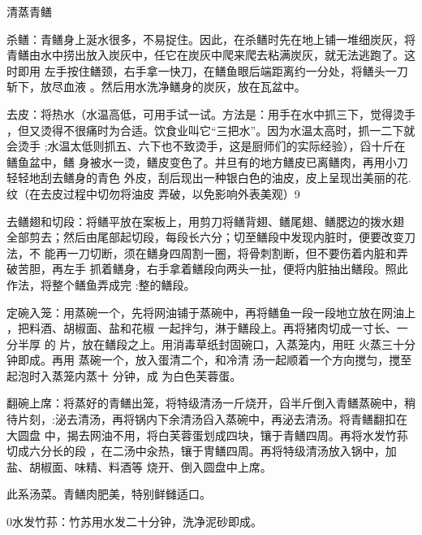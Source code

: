 \begin{recipe}{清蒸青鳝}

\ingredients



\cooking

\step 杀鳝：青鳝身上涎水很多，不易捉住。因此，在杀鳝时先在地上铺一堆细炭灰，将
青鳝由水中捞出放入炭灰中，任它在炭灰中爬来爬去粘满炭灰，就无法逃跑了。这时即用
左手按住鳝颈，右手拿一快刀，在鳝鱼眼后端距离约一分处，将鳝头一刀斩下，放尽血液
。然后用水洗净鳝身的炭灰，放在瓦盆中。

\step 去皮：将热水（水温高低，可用手试一试。方法是：用手在水中抓三下，觉得烫手
，但又烫得不很痛时为合适。饮食业叫它“三把水”。因为水温太高时，抓一二下就会烫手
;水温太低则抓五、六下也不致烫手，这是厨师们的实际经验），舀十斤在鳝鱼盆中，鳝
身被水一烫，鳝皮变色了。并旦有的地方鳝皮已离鳝肉，再用小刀轻轻地刮去鳝身的青色
外皮，刮后现出一种银白色的油皮，皮上呈现岀美丽的花.纹（在去皮过程中切勿将油皮
弄破，以免影响外表美观）9

\step 去鳝翅和切段：将鳝平放在案板上，用剪刀将鳝背翅、鳝尾翅、鳝腮边的拨水翅
全部剪去；然后由尾部起切段，每段长六分；切至鳝段中发现内脏时，便要改变刀法，不
能再一刀切断，须在鳝身四周割一圈，将骨刺割断，但不要伤着内脏和弄破苦胆，再左手
抓着鳝身，右手拿着鳝段向两头一扯，便将内脏抽出鳝段。照此作法，将整个鳝鱼弄成完
:整的鳝段。

\step 定碗入笼：用蒸碗一个，先将网油铺于蒸碗中，再将鳝鱼一段一段地立放在网油上
，把料酒、胡椒面、盐和花椒 一起拌匀，淋于鳝段上。再将猪肉切成一寸长、一分半厚
的 片，放在鳝段之上。用消毒草纸封固碗口，入蒸笼内，用旺 火蒸三十分钟即成。再用
蒸碗一个，放入蛋清二个，和冷清 汤一起顺着一个方向搅匀，搅至起泡时入蒸笼内蒸十
分钟，成 为白色芙蓉蛋。

\step 翻碗上席：将蒸好的青鳝出笼，将特级清汤一斤烧开，舀半斤倒入青鳝蒸碗中，稍
待片刻，:泌去清汤，再将锅内下余清汤舀入蒸碗中，再泌去清汤。将青鳝翻扣在大圆盘
中，揭去网油不用，将白芙蓉蛋划成四块，镶于青鳝四周。再将水发竹荪切成六分长的段
，在二汤中汆热，镶于冑鳝四周。再将特级清汤放入锅中，加盐、胡椒面、味精、料酒等
烧开、倒入圆盘中上席。

\notes

此系汤菜。青鳝肉肥美，特别鲜雠适口。

0水发竹荪：竹苏用水发二十分钟，洗净泥砂即成。

\end{recipe}


